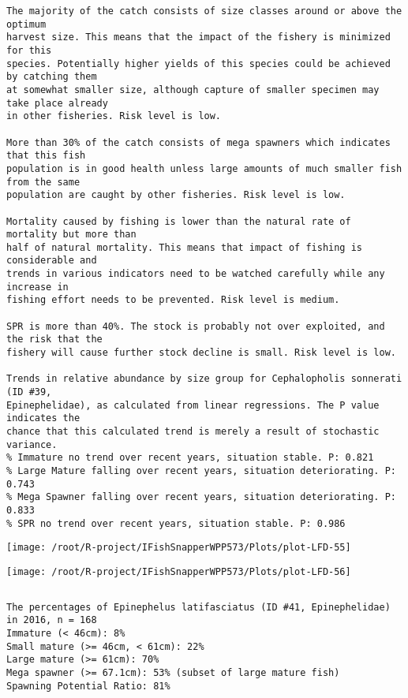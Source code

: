 \documentclass{report}\usepackage[]{graphicx}\usepackage[]{color}
\makeatletter
\def\maxwidth{ %
  \ifdim\Gin@nat@width>\linewidth
    \linewidth
  \else
    \Gin@nat@width
  \fi
}
\newenvironment{kframe}{%
 \def\at@end@of@kframe{}%
 \ifinner\ifhmode%
  \def\at@end@of@kframe{\end{minipage}}%
  \begin{minipage}{\columnwidth}%
 \fi\fi%
 \def\FrameCommand##1{\hskip\@totalleftmargin \hskip-\fboxsep
 \colorbox{shadecolor}{##1}\hskip-\fboxsep
     \hskip-\linewidth \hskip-\@totalleftmargin \hskip\columnwidth}%
 \MakeFramed {\advance\hsize-\width
   \@totalleftmargin\z@ \linewidth\hsize
   \@setminipage}}%
 {\par\unskip\endMakeFramed%
 \at@end@of@kframe}
\newenvironment{knitrout}{}{} %
\makeatother
\begin{document}
\begin{knitrout}
\begin{kframe}
\begin{verbatim}
The majority of the catch consists of size classes around or above the optimum
harvest size. This means that the impact of the fishery is minimized for this
species. Potentially higher yields of this species could be achieved by catching them
at somewhat smaller size, although capture of smaller specimen may take place already
in other fisheries. Risk level is low.

More than 30% of the catch consists of mega spawners which indicates that this fish
population is in good health unless large amounts of much smaller fish from the same
population are caught by other fisheries. Risk level is low.
 
Mortality caused by fishing is lower than the natural rate of mortality but more than
half of natural mortality. This means that impact of fishing is considerable and
trends in various indicators need to be watched carefully while any increase in
fishing effort needs to be prevented. Risk level is medium.
 
SPR is more than 40%. The stock is probably not over exploited, and the risk that the
fishery will cause further stock decline is small. Risk level is low.
 
Trends in relative abundance by size group for Cephalopholis sonnerati (ID #39,
Epinephelidae), as calculated from linear regressions. The P value indicates the
chance that this calculated trend is merely a result of stochastic variance.
% Immature no trend over recent years, situation stable. P: 0.821
% Large Mature falling over recent years, situation deteriorating. P: 0.743
% Mega Spawner falling over recent years, situation deteriorating. P: 0.833
% SPR no trend over recent years, situation stable. P: 0.986
\end{verbatim}
\end{kframe}
\texttt{[image: /root/R-project/IFishSnapperWPP573/Plots/plot-LFD-55]} 

\texttt{[image: /root/R-project/IFishSnapperWPP573/Plots/plot-LFD-56]} 
\begin{kframe}\begin{verbatim}
\end{verbatim}
\end{kframe}
\clearpage
\newpage
\begin{kframe}\begin{verbatim}The percentages of Epinephelus latifasciatus (ID #41, Epinephelidae) in 2016, n = 168
Immature (< 46cm): 8%
Small mature (>= 46cm, < 61cm): 22%
Large mature (>= 61cm): 70%
Mega spawner (>= 67.1cm): 53% (subset of large mature fish)
Spawning Potential Ratio: 81%
 

\end{verbatim}
\end{kframe}
\end{knitrout}
\end{document}
